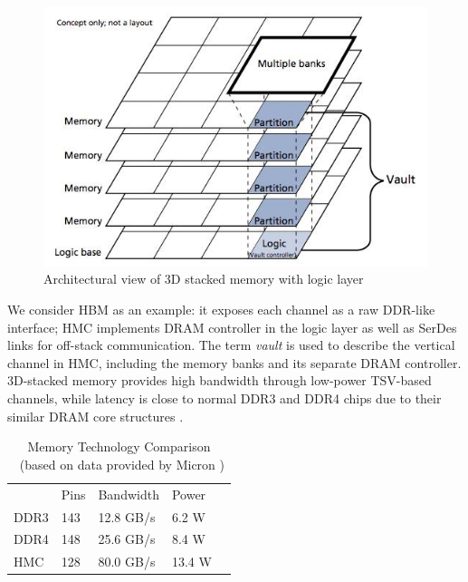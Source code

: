 \documentclass[letterpaper, 11pt, conference, margin=1in]{ieeeconf}   %
\begin{document}
\begin{figure}[h]
	\centering
  \includegraphics[scale=0.3]{hmc_concept.jpg}
  \caption{Architectural view of 3D stacked memory with logic layer}
  \label{fig:3dstack}
\end{figure}

We consider HBM as an example: it exposes each channel as a raw DDR-like interface; HMC implements DRAM controller in the logic layer as well as SerDes links for off-stack communication. The term \textit{vault} is used to describe the vertical channel in HMC, including the memory banks and its separate DRAM controller. 3D-stacked memory provides high bandwidth through low-power TSV-based channels, while latency is close to normal DDR3 and DDR4 chips due to their similar DRAM core structures \cite{6757501}.

\begin{table}[h]
\centering
\caption{Memory Technology Comparison \
        (based on data provided by Micron \cite{HMC-1.0})}
\label{tab:table1}
\begin{tabular}{|l|l|l|l|l}
\cline{1-4}
     & Pins & Bandwidth & Power  &  \\ \cline{1-4}
DDR3 & 143  & 12.8 GB/s & 6.2 W  &  \\ \cline{1-4}
DDR4 & 148  & 25.6 GB/s & 8.4 W  &  \\ \cline{1-4}
HMC  & 128  & 80.0 GB/s & 13.4 W &  \\ \cline{1-4}
\end{tabular}
\end{table}
\end{document}
